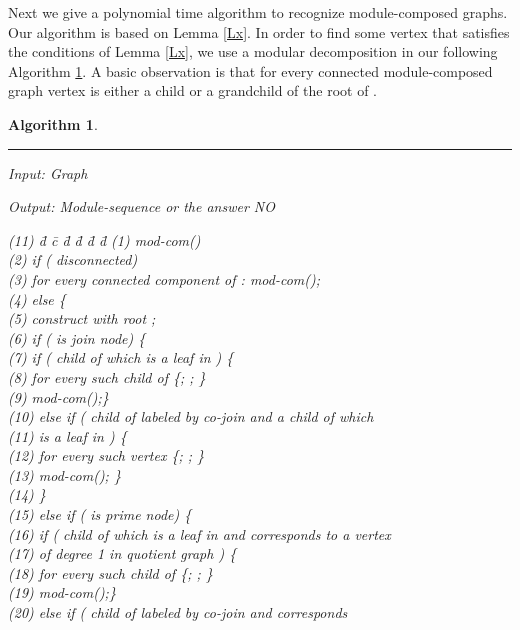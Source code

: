 \documentclass[11pt]{article}
\newtheorem{alg}[theorem]{Algorithm}
\begin{document}
Next we give a polynomial time algorithm to recognize module-composed graphs.
Our algorithm is based on Lemma \ref{Lx}. In order to find some vertex  that satisfies the 
conditions of Lemma \ref{Lx}, we use a modular decomposition \cite{CH94} 
in our following Algorithm \ref{a2}. A basic observation is that for every connected module-composed
graph  vertex  is either a child or a grandchild of the root of .






\begin{alg} \label{a2} ~
\hrule

\medskip
\noindent
Input: Graph 

\noindent
Output: Module-sequence  or the answer NO

\begin{tabbing}
(11) \= d \= c \=  d \=  d \=  d \=  d\kill
(1)  \>  mod-com()   \\
(2)  \> \> if ( disconnected)\\
(3)  \> \> \> for every connected component  of : mod-com(); \\
(4)  \> \> else \{ \\
(5)  \> \> \> construct  with root ; \\
(6)  \> \> \> if ( is join node) \{ \\
(7)  \> \> \> \> if ( child  of  which is a leaf in ) \{  \\
(8)  \> \> \> \>    \>for every such child  of   \{; ; \}\\
(9)  \> \> \> \> \>mod-com();\}\\
(10)  \> \> \> \> else if ( child  of  labeled by co-join and a child  of  which \\
(11)  \> \> \> \> is a leaf in ) \{  \\
(12)  \> \> \> \>    \>for every such vertex   \{; ; \}\\
(13) \> \> \> \> \>mod-com(); \} \\ 
(14)  \> \> \> \} \\
(15)  \> \> \> else if ( is prime node) \{ \\
(16)  \> \> \> \> if ( child  of  which is a leaf in  and corresponds
to a vertex \\
(17)  \> \> \> \> of degree 1 in quotient graph ) \{  \\
(18)  \> \> \> \>    \>for every such child  of   \{; ; \}\\
(19)  \> \> \> \> \>mod-com();\}\\
(20)  \> \> \> \> else if ( child  of  labeled by co-join and corresponds

\end{tabbing}
\end{alg}
\end{document}
